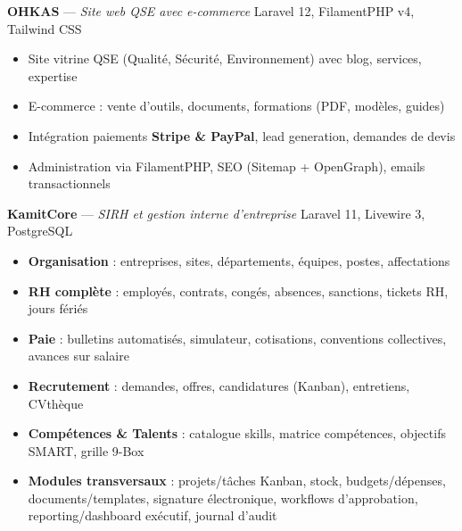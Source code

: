 \documentclass[a4paper,11pt]{article}
\begin{document}
\vspace{3pt}

{\textbf{\color{darktext}OHKAS} — \textit{Site web QSE avec e-commerce}} \hfill {\small\color{graytext}Laravel 12, FilamentPHP v4, Tailwind CSS}
\begin{itemize}[leftmargin=12pt, itemsep=0pt, topsep=2pt]
    \item Site vitrine QSE (Qualité, Sécurité, Environnement) avec blog, services, expertise
    \item E-commerce : vente d'outils, documents, formations (PDF, modèles, guides)
    \item Intégration paiements \textbf{Stripe \& PayPal}, lead generation, demandes de devis
    \item Administration via FilamentPHP, SEO (Sitemap + OpenGraph), emails transactionnels
\end{itemize}

\vspace{3pt}

{\textbf{\color{darktext}KamitCore} — \textit{SIRH et gestion interne d'entreprise}} \hfill {\small\color{graytext}Laravel 11, Livewire 3, PostgreSQL}
\begin{itemize}[leftmargin=12pt, itemsep=0pt, topsep=2pt]
    \item \textbf{Organisation} : entreprises, sites, départements, équipes, postes, affectations
    \item \textbf{RH complète} : employés, contrats, congés, absences, sanctions, tickets RH, jours fériés
    \item \textbf{Paie} : bulletins automatisés, simulateur, cotisations, conventions collectives, avances sur salaire
    \item \textbf{Recrutement} : demandes, offres, candidatures (Kanban), entretiens, CVthèque
    \item \textbf{Compétences \& Talents} : catalogue skills, matrice compétences, objectifs SMART, grille 9-Box
    \item \textbf{Modules transversaux} : projets/tâches Kanban, stock, budgets/dépenses, documents/templates, signature électronique, workflows d'approbation, reporting/dashboard exécutif, journal d'audit
\end{itemize}

\vspace{3pt}
\end{document}
